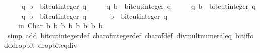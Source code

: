 \begin{isabellebody}
\ \ \ \ \ {\isacharparenleft}{\kern0pt}q{}{\isacharcomma}{\kern0pt}\ b{}{\isacharparenright}{\kern0pt}\ {\isacharequal}{\kern0pt}\ bit{\isacharunderscore}{\kern0pt}cut{\isacharunderscore}{\kern0pt}integer\ q{}{\isacharsemicolon}{\kern0pt}\isanewline
\ \ \ \ \ {\isacharparenleft}{\kern0pt}q{}{\isacharcomma}{\kern0pt}\ b{}{\isacharparenright}{\kern0pt}\ {\isacharequal}{\kern0pt}\ bit{\isacharunderscore}{\kern0pt}cut{\isacharunderscore}{\kern0pt}integer\ q{}{\isacharsemicolon}{\kern0pt}\isanewline
\ \ \ \ \ {\isacharparenleft}{\kern0pt}q{}{\isacharcomma}{\kern0pt}\ b{}{\isacharparenright}{\kern0pt}\ {\isacharequal}{\kern0pt}\ bit{\isacharunderscore}{\kern0pt}cut{\isacharunderscore}{\kern0pt}integer\ q{}{\isacharsemicolon}{\kern0pt}\isanewline
\ \ \ \ \ {\isacharparenleft}{\kern0pt}q{}{\isacharcomma}{\kern0pt}\ b{}{\isacharparenright}{\kern0pt}\ {\isacharequal}{\kern0pt}\ bit{\isacharunderscore}{\kern0pt}cut{\isacharunderscore}{\kern0pt}integer\ q{}{\isacharsemicolon}{\kern0pt}\isanewline
\ \ \ \ \ {\isacharparenleft}{\kern0pt}{\isacharunderscore}{\kern0pt}{\isacharcomma}{\kern0pt}\ b{}{\isacharparenright}{\kern0pt}\ {\isacharequal}{\kern0pt}\ bit{\isacharunderscore}{\kern0pt}cut{\isacharunderscore}{\kern0pt}integer\ q{}\isanewline
\ \ \ \ in\ Char\ b{}\ b{}\ b{}\ b{}\ b{}\ b{}\ b{}\ b{}{\isacharparenright}{\kern0pt}{\isachardoublequoteclose}\isanewline
%
\isadelimproof
\ \ %
\endisadelimproof
%
\isatagproof
{}\isamarkupfalse%
\ {\isacharparenleft}{\kern0pt}simp\ add{\isacharcolon}{\kern0pt}\ bit{\isacharunderscore}{\kern0pt}cut{\isacharunderscore}{\kern0pt}integer{\isacharunderscore}{\kern0pt}def\ char{\isacharunderscore}{\kern0pt}of{\isacharunderscore}{\kern0pt}integer{\isacharunderscore}{\kern0pt}def\ char{\isacharunderscore}{\kern0pt}of{\isacharunderscore}{\kern0pt}def\ div{\isacharunderscore}{\kern0pt}mult{}{\isacharunderscore}{\kern0pt}numeral{\isacharunderscore}{\kern0pt}eq\ bit{\isacharunderscore}{\kern0pt}iff{\isacharunderscore}{\kern0pt}odd{\isacharunderscore}{\kern0pt}drop{\isacharunderscore}{\kern0pt}bit\ drop{\isacharunderscore}{\kern0pt}bit{\isacharunderscore}{\kern0pt}eq{\isacharunderscore}{\kern0pt}div{\isacharparenright}{\kern0pt}%
\endisatagproof
{\isafoldproof}%
%
\isadelimproof
\isanewline
%
\endisadelimproof
\isanewline
{}\isamarkupfalse%

\end{isabellebody}

